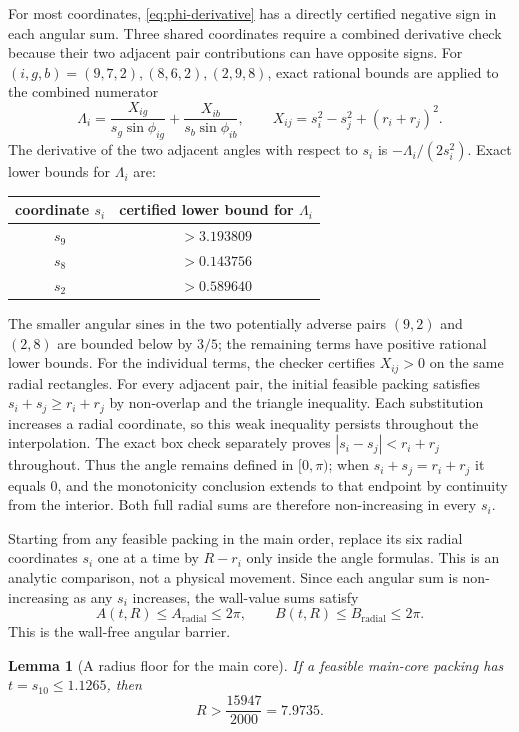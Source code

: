 \documentclass[11pt,a4paper]{article}
\newtheorem{lemma}[theorem]{Lemma}
\theoremstyle{remark}
\begin{document}
For most coordinates, \eqref{eq:phi-derivative} has a directly certified
negative sign in each angular sum.  Three shared coordinates require a
combined derivative check because their two adjacent pair contributions
can have opposite signs.  For $(i,g,b)=(9,7,2),(8,6,2),(2,9,8)$, exact
rational bounds are applied to the combined numerator
\[
 \Lambda_i=\frac{X_{ig}}{s_g\sin\phi_{ig}}
          +\frac{X_{ib}}{s_b\sin\phi_{ib}},
 \qquad X_{ij}=s_i^2-s_j^2+(r_i+r_j)^2.
\]
The derivative of the two adjacent angles with respect to $s_i$ is
$-\Lambda_i/(2s_i^2)$.  Exact lower bounds for $\Lambda_i$ are:
\begin{center}
\begin{tabular}{cc}
\toprule
coordinate $s_i$ & certified lower bound for $\Lambda_i$\\
\midrule
$s_9$ & $>3.193809$\\
$s_8$ & $>0.143756$\\
$s_2$ & $>0.589640$\\
\bottomrule
\end{tabular}
\end{center}
The smaller angular sines in the two potentially adverse pairs $(9,2)$ and
$(2,8)$ are bounded below by $3/5$; the remaining terms have positive
rational lower bounds.  For the individual terms, the checker certifies
$X_{ij}>0$ on the same radial rectangles.  For every adjacent pair, the
initial feasible packing satisfies $s_i+s_j\ge r_i+r_j$ by non-overlap and
the triangle inequality.  Each substitution increases a radial coordinate,
so this weak inequality persists throughout the interpolation.  The exact
box check separately proves $|s_i-s_j|<r_i+r_j$ throughout.  Thus the angle
remains defined in $[0,\pi)$; when $s_i+s_j=r_i+r_j$ it equals $0$, and the
monotonicity conclusion extends to that endpoint by continuity from the
interior.  Both full radial sums are therefore non-increasing in every
$s_i$.

Starting from any feasible packing in the main order, replace its six radial
coordinates $s_i$ one at a time by $R-r_i$ only inside the angle formulas.
This is an analytic comparison, not a physical movement.  Since each angular
sum is non-increasing as any $s_i$ increases, the wall-value sums satisfy
\[
  A(t,R)\le A_{\mathrm{radial}}\le2\pi,\qquad
  B(t,R)\le B_{\mathrm{radial}}\le2\pi.
 \label{eq:wall-angle-necessary}
\]
This is the wall-free angular barrier.

\begin{lemma}[A radius floor for the main core]
\label{lem:main-radius-floor}
If a feasible main-core packing has $t=s_{10}\le1.1265$, then
\[
 R>\frac{15947}{2000}=7.9735.
\]
\end{lemma}
\end{document}
